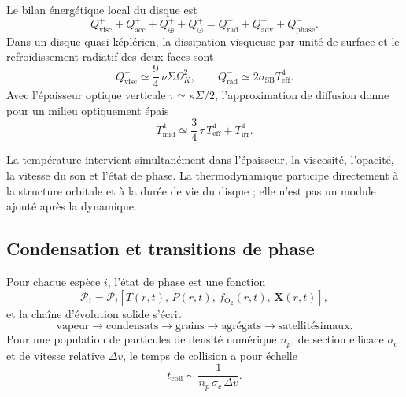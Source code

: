 \documentclass[11pt,a4paper,openany]{report}
\begin{document}
Le bilan énergétique local du disque est
\begin{equation}
Q^{+}_{\mathrm{visc}}+Q^{+}_{\mathrm{acc}}+Q^{+}_{\oplus}+Q^{+}_{\odot}
=Q^{-}_{\mathrm{rad}}+Q^{-}_{\mathrm{adv}}+Q^{-}_{\mathrm{phase}}.
\label{eq:bilanE}
\end{equation}
Dans un disque quasi képlérien, la dissipation visqueuse par unité de surface et le
refroidissement radiatif des deux faces sont
\begin{equation}
Q^{+}_{\mathrm{visc}}\simeq\frac94\,\nu\Sigma\Omega_K^2,
\qquad
Q^{-}_{\mathrm{rad}}\simeq2\sigma_{\mathrm{SB}}T_{\mathrm{eff}}^4.
\label{eq:Qvisc}
\end{equation}
Avec l'épaisseur optique verticale $\tau\simeq\kappa\Sigma/2$, l'approximation de diffusion
donne pour un milieu optiquement épais
\begin{equation}
T_{\mathrm{mid}}^4\simeq\frac34\,\tau\,T_{\mathrm{eff}}^4+T_{\mathrm{irr}}^4.
\label{eq:Tmid}
\end{equation}

\begin{lecture}
La température intervient simultanément dans l'épaisseur, la viscosité, l'opacité, la vitesse du
son et l'état de phase. La thermodynamique participe directement à la structure orbitale et à la
durée de vie du disque ; elle n'est pas un module ajouté après la dynamique.
\end{lecture}

\subsection{Condensation et transitions de phase}

Pour chaque espèce $i$, l'état de phase est une fonction
\begin{equation}
\mathcal{P}_i=\mathcal{P}_i\!\left[T(r,t),\,P(r,t),\,f_{\mathrm{O_2}}(r,t),\,\mathbf{X}(r,t)\right],
\label{eq:phase}
\end{equation}
et la chaîne d'évolution solide s'écrit
\begin{equation}
\text{vapeur}\rightarrow\text{condensats}\rightarrow\text{grains}\rightarrow
\text{agrégats}\rightarrow\text{satellitésimaux}.
\label{eq:chaine}
\end{equation}
Pour une population de particules de densité numérique $n_p$, de section efficace $\sigma_c$ et
de vitesse relative $\Delta v$, le temps de collision a pour échelle
\begin{equation}
t_{\mathrm{coll}}\sim\frac{1}{n_p\,\sigma_c\,\Delta v}.
\label{eq:tcoll}
\end{equation}
\end{document}
